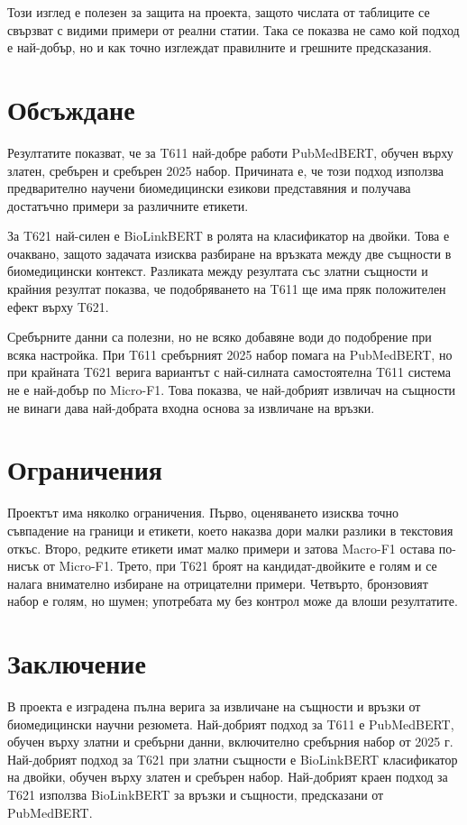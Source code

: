 \documentclass[12pt,a4paper]{article}
\begin{document}
Този изглед е полезен за защита на проекта, защото числата от таблиците се свързват с видими примери от реални статии. Така се показва не само кой подход е най-добър, но и как точно изглеждат правилните и грешните предсказания.

\section{Обсъждане}

Резултатите показват, че за T611 най-добре работи PubMedBERT, обучен върху златен, сребърен и сребърен 2025 набор. Причината е, че този подход използва предварително научени биомедицински езикови представяния и получава достатъчно примери за различните етикети.

За T621 най-силен е BioLinkBERT в ролята на класификатор на двойки. Това е очаквано, защото задачата изисква разбиране на връзката между две същности в биомедицински контекст. Разликата между резултата със златни същности и крайния резултат показва, че подобряването на T611 ще има пряк положителен ефект върху T621.

Сребърните данни са полезни, но не всяко добавяне води до подобрение при всяка настройка. При T611 сребърният 2025 набор помага на PubMedBERT, но при крайната T621 верига вариантът с най-силната самостоятелна T611 система не е най-добър по Micro-F1. Това показва, че най-добрият извличач на същности не винаги дава най-добрата входна основа за извличане на връзки.

\section{Ограничения}

Проектът има няколко ограничения. Първо, оценяването изисква точно съвпадение на граници и етикети, което наказва дори малки разлики в текстовия откъс. Второ, редките етикети имат малко примери и затова Macro-F1 остава по-нисък от Micro-F1. Трето, при T621 броят на кандидат-двойките е голям и се налага внимателно избиране на отрицателни примери. Четвърто, бронзовият набор е голям, но шумен; употребата му без контрол може да влоши резултатите.

\section{Заключение}

В проекта е изградена пълна верига за извличане на същности и връзки от биомедицински научни резюмета. Най-добрият подход за T611 е PubMedBERT, обучен върху златни и сребърни данни, включително сребърния набор от 2025 г. Най-добрият подход за T621 при златни същности е BioLinkBERT класификатор на двойки, обучен върху златен и сребърен набор. Най-добрият краен подход за T621 използва BioLinkBERT за връзки и същности, предсказани от PubMedBERT.
\end{document}
